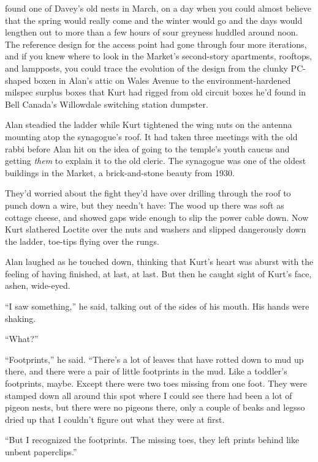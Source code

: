  found one of Davey's old nests in March, on a day when you could
almost believe that the spring would really come and the winter would
go and the days would lengthen out to more than a few hours of sour
greyness huddled around noon.  The reference design for the access
point had gone through four more iterations, and if you knew where to
look in the Market's second-story apartments, rooftops, and lampposts,
you could trace the evolution of the design from the clunky PC-shaped
boxen in Alan's attic on Wales Avenue to the environment-hardened
milspec surplus boxes that Kurt had rigged from old circuit boxes he'd
found in Bell Canada's Willowdale switching station dumpster.

Alan steadied the ladder while Kurt tightened the wing nuts on the
antenna mounting atop the synagogue's roof.  It had taken three
meetings with the old rabbi before Alan hit on the idea of going to
the temple's youth caucus and getting \textit{them} to explain it to
the old cleric.  The synagogue was one of the oldest buildings in the
Market, a brick-and-stone beauty from 1930.

They'd worried about the fight they'd have over drilling through the
roof to punch down a wire, but they needn't have:  The wood up there
was soft as cottage cheese, and showed gaps wide enough to slip the
power cable down.  Now Kurt slathered Loctite over the nuts and
washers and slipped dangerously down the ladder, toe-tips flying over
the rungs.

Alan laughed as he touched down, thinking that Kurt's heart was aburst
with the feeling of having finished, at last, at last.  But then he
caught sight of Kurt's face, ashen, wide-eyed.

``I saw something,'' he said, talking out of the sides of his mouth. 
His hands were shaking.

``What?''

``Footprints,'' he said.  ``There's a lot of leaves that have rotted
down to mud up there, and there were a pair of little footprints in
the mud.  Like a toddler's footprints, maybe.  Except there were two
toes missing from one foot.  They were stamped down all around this
spot where I could see there had been a lot of pigeon nests, but there
were no pigeons there, only a couple of beaks and legs\dash{}so dried up
that I couldn't figure out what they were at first.

``But I recognized the footprints.  The missing toes, they left prints
behind like unbent paperclips.''

